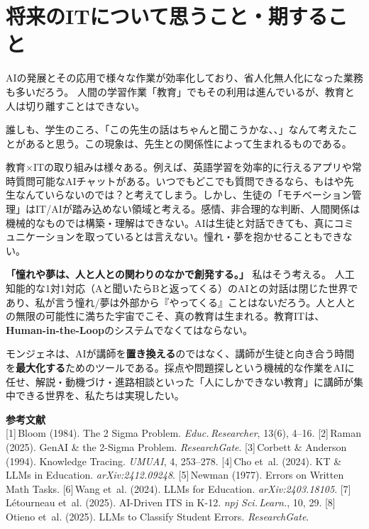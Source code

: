 \documentclass[paper=a4,fontsize=10.5bp,jafontsize=10.5bp,twocolumn]{jlreq}
\begin{document}
\section{将来のITについて思うこと・期すること}

AIの発展とその応用で様々な作業が効率化しており、省人化無人化になった業務も多いだろう。
人間の学習作業「教育」でもその利用は進んでいるが、教育と人は切り離すことはできない。

誰しも、学生のころ、「この先生の話はちゃんと聞こうかな、、」なんて考えたことがあると思う。この現象は、先生との関係性によって生まれるものである。

教育×ITの取り組みは様々ある。例えば、英語学習を効率的に行えるアプリや常時質問可能なAIチャットがある。いつでもどこでも質問できるなら、もはや先生なんていらないのでは？と考えてしまう。しかし、生徒の「モチベーション管理」はIT/AIが踏み込めない領域と考える。感情、非合理的な判断、人間関係は機械的なものでは構築・理解はできない。AIは生徒と対話できても、真にコミュニケーションを取っているとは言えない。憧れ・夢を抱かせることもできない。

\begin{highlightbox}
\textbf{「憧れや夢は、人と人との関わりのなかで創発する。」}
私はそう考える。
人工知能的な1対1対応（Aと聞いたらBと返ってくる）のAIとの対話は閉じた世界であり、私が言う憧れ/夢は外部から『やってくる』ことはないだろう。人と人との無限の可能性に満ちた宇宙でこそ、真の教育は生まれる。教育ITは、\textbf{Human-in-the-Loop}のシステムでなくてはならない。
\end{highlightbox}

モンジェネは、AIが講師を\textbf{置き換える}のではなく、講師が生徒と向き合う時間を\textbf{最大化する}ためのツールである。採点や問題探しという機械的な作業をAIに任せ、解説・動機づけ・進路相談といった「人にしかできない教育」に講師が集中できる世界を、私たちは実現したい。

\vspace{0.3em}
{\scriptsize\noindent\textbf{参考文献}\\[2pt]
{[1]}\,Bloom (1984). The 2 Sigma Problem. \textit{Educ.\,Researcher}, 13(6), 4--16.\quad
{[2]}\,Raman (2025). GenAI \& the 2-Sigma Problem. \textit{ResearchGate}.\quad
{[3]}\,Corbett \& Anderson (1994). Knowledge Tracing. \textit{UMUAI}, 4, 253--278.\quad
{[4]}\,Cho et~al. (2024). KT \& LLMs in Education. \textit{arXiv:2412.09248}.\quad
{[5]}\,Newman (1977). Errors on Written Math Tasks.\quad
{[6]}\,Wang et~al. (2024). LLMs for Education. \textit{arXiv:2403.18105}.\quad
{[7]}\,L\'{e}tourneau et~al. (2025). AI-Driven ITS in K-12. \textit{npj Sci.\,Learn.}, 10, 29.\quad
{[8]}\,Otieno et~al. (2025). LLMs to Classify Student Errors. \textit{ResearchGate}.}
\end{document}
